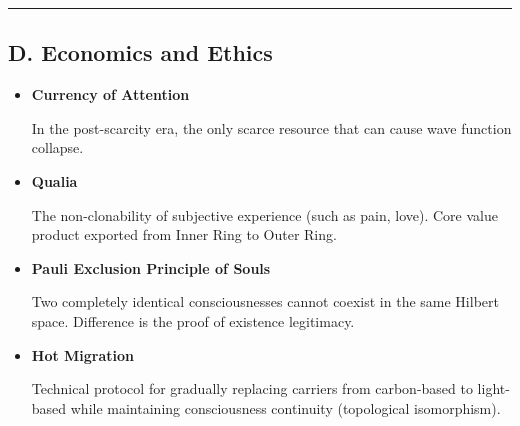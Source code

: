 \hrule

\subsection{D. Economics and Ethics}

\begin{itemize}
\item \textbf{Currency of Attention}

    In the post-scarcity era, the only scarce resource that can cause wave function collapse.

\item \textbf{Qualia}

    The non-clonability of subjective experience (such as pain, love). Core value product exported from Inner Ring to Outer Ring.

\item \textbf{Pauli Exclusion Principle of Souls}

    Two completely identical consciousnesses cannot coexist in the same Hilbert space. Difference is the proof of existence legitimacy.

\item \textbf{Hot Migration}

    Technical protocol for gradually replacing carriers from carbon-based to light-based while maintaining consciousness continuity (topological isomorphism).
\end{itemize}
